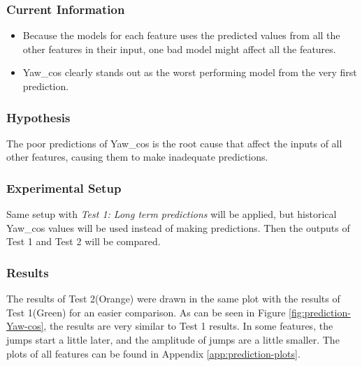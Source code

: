 \documentclass[12pt,twoside]{report}
\begin{document}
\subsubsection{Current Information}
\begin{itemize}
    \item Because the models for each feature uses the predicted values from all the other features in their input, one bad model might affect all the features.
    \item Yaw\_cos clearly stands out as the worst performing model from the very first prediction.
\end{itemize}

\subsubsection{Hypothesis}
The poor predictions of Yaw\_cos is the root cause that affect the inputs of all other features, causing them to make inadequate predictions.

\subsubsection{Experimental Setup}
Same setup with \textit{Test 1: Long term predictions} will be applied, but historical Yaw\_cos values will be used instead of making predictions. Then the outputs of Test 1 and Test 2 will be compared.

\subsubsection{Results}
The results of Test 2(Orange) were drawn in the same plot with the results of Test 1(Green) for an easier comparison. As can be seen in Figure \ref{fig:prediction-Yaw-cos}, the results are very similar to Test 1 results. In some features, the jumps start a little later, and the amplitude of jumps are a little smaller. The plots of all features can be found in Appendix \ref{app:prediction-plots}.
\end{document}
